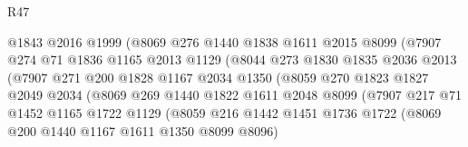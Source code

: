 \begin{lexlean}{R47}
\begin{coremodule}
                                @1843
                                @2016
                                @1999
                                (@8069
                                  @276
                                  @1440
                                  @1838
                                  @1611
                                  @2015
                                  @8099
                                  (@7907
                                    @274
                                    @71
                                    @1836
                                    @1165
                                    @2013
                                    @1129
                                    (@8044
                                      @273
                                      @1830
                                      @1835
                                      @2036
                                      @2013
                                      (@7907
                                        @271
                                        @200
                                        @1828
                                        @1167
                                        @2034
                                        @1350
                                        (@8059
                                          @270
                                          @1823
                                          @1827
                                          @2049
                                          @2034
                                          (@8069
                                            @269
                                            @1440
                                            @1822
                                            @1611
                                            @2048
                                            @8099
                                            (@7907
                                              @217
                                              @71
                                              @1452
                                              @1165
                                              @1722
                                              @1129
                                              (@8059
                                                @216
                                                @1442
                                                @1451
                                                @1736
                                                @1722
                                                (@8069 @200 @1440 @1167 @1611 @1350 @8099 @8096)

\end{coremodule}
\end{lexlean}
